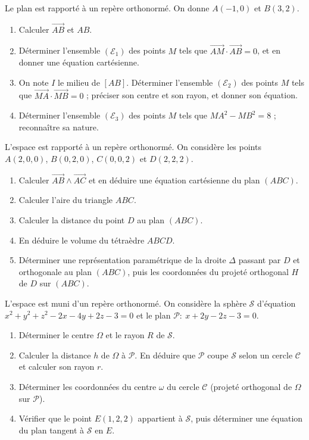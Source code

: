 Le plan est rapporté à un repère orthonormé. On donne $A(-1,0)$ et $B(3,2)$.
\begin{enumerate}[label=\arabic*)]
\item Calculer $\overrightarrow{AB}$ et $AB$.
\item Déterminer l'ensemble $(\mathcal E_1)$ des points $M$ tels que $\overrightarrow{AM}\cdot\overrightarrow{AB}=0$, et en donner une équation cartésienne.
\item On note $I$ le milieu de $[AB]$. Déterminer l'ensemble $(\mathcal E_2)$ des points $M$ tels que $\overrightarrow{MA}\cdot\overrightarrow{MB}=0$ ; préciser son centre et son rayon, et donner son équation.
\item Déterminer l'ensemble $(\mathcal E_3)$ des points $M$ tels que $MA^{2}-MB^{2}=8$ ; reconnaître sa nature.
\end{enumerate}

L'espace est rapporté à un repère orthonormé. On considère les points
$A(2,0,0)$, $B(0,2,0)$, $C(0,0,2)$ et $D(2,2,2)$.
\begin{enumerate}[label=\arabic*)]
\item Calculer $\overrightarrow{AB}\wedge\overrightarrow{AC}$ et en déduire une équation cartésienne du plan $(ABC)$.
\item Calculer l'aire du triangle $ABC$.
\item Calculer la distance du point $D$ au plan $(ABC)$.
\item En déduire le volume du tétraèdre $ABCD$.
\item Déterminer une représentation paramétrique de la droite $\Delta$ passant par $D$ et orthogonale au plan $(ABC)$, puis les coordonnées du projeté orthogonal $H$ de $D$ sur $(ABC)$.
\end{enumerate}

L'espace est muni d'un repère orthonormé. On considère la sphère $\mathcal S$ d'équation
$x^{2}+y^{2}+z^{2}-2x-4y+2z-3=0$ et le plan $\mathcal P:\ x+2y-2z-3=0$.
\begin{enumerate}[label=\arabic*)]
\item Déterminer le centre $\Omega$ et le rayon $R$ de $\mathcal S$.
\item Calculer la distance $h$ de $\Omega$ à $\mathcal P$. En déduire que $\mathcal P$ coupe $\mathcal S$ selon un cercle $\mathcal C$ et calculer son rayon $r$.
\item Déterminer les coordonnées du centre $\omega$ du cercle $\mathcal C$ (projeté orthogonal de $\Omega$ sur $\mathcal P$).
\item Vérifier que le point $E(1,2,2)$ appartient à $\mathcal S$, puis déterminer une équation du plan tangent à $\mathcal S$ en $E$.
\end{enumerate}

